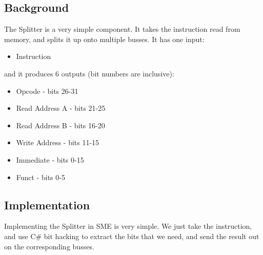 \documentclass{beamer}
\begin{document}
\subsection{Background}
\begin{frame}
    The Splitter is a very simple component. It takes the instruction read from
    memory, and splits it up onto multiple busses. It has one input:
    \begin{itemize}
        \item Instruction
    \end{itemize}
    and it produces 6 outputs (bit numbers are inclusive):
    \begin{itemize}
        \item Opcode - bits 26-31
        \item Read Address A - bits 21-25
        \item Read Address B - bits 16-20
        \item Write Address - bits 11-15
        \item Immediate - bits 0-15
        \item Funct - bits 0-5
    \end{itemize}
\end{frame}
\begin{frame}
    \begin{figure}
    \end{figure}
\end{frame}
\subsection{Implementation}
\begin{frame}
    Implementing the Splitter in SME is very simple. We just take the
    instruction, and use C\# bit hacking to extract the bits that we need, and
    send the result out on the corresponding busses.
\end{frame}
\end{document}
